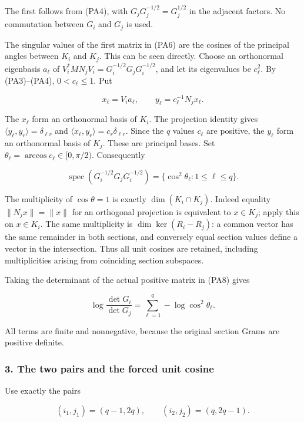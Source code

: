The first follows from (PA4), with \(G_jG_j^{-1/2}=G_j^{1/2}\) in the adjacent factors. No commutation between \(G_i\) and \(G_j\) is used.

The singular values of the first matrix in (PA6) are the cosines of the principal angles between \(K_i\) and \(K_j\). This can be seen directly. Choose an orthonormal eigenbasis \(a_\ell\) of \(V_i^*MN_jV_i=G_i^{-1/2}G_jG_i^{-1/2}\), and let its eigenvalues be \(c_\ell^2\). By (PA3)--(PA4), \(0<c_\ell\le1\). Put

\[
x_\ell=V_i a_\ell,\qquad
y_\ell=c_\ell^{-1}N_jx_\ell.
\tag{PA7}
\]

The \(x_\ell\) form an orthonormal basis of \(K_i\). The projection identity gives \(\langle y_\ell,y_r\rangle=\delta_{\ell r}\) and \(\langle x_\ell,y_r\rangle=c_r\delta_{\ell r}\). Since the \(q\) values \(c_\ell\) are positive, the \(y_\ell\) form an orthonormal basis of \(K_j\). These are principal bases. Set \(\theta_\ell=\arccos c_\ell\in[0,\pi/2)\). Consequently

\[
\boxed{\operatorname{spec}(G_i^{-1/2}G_jG_i^{-1/2})
=\{\cos^2\theta_\ell:1\le\ell\le q\}.}
\tag{PA8}
\]

The multiplicity of \(\cos\theta=1\) is exactly \(\dim(K_i\cap K_j)\). Indeed equality \(\|N_jx\|=\|x\|\) for an orthogonal projection is equivalent to \(x\in K_j\); apply this on \(x\in K_i\). The same multiplicity is \(\dim\ker(R_i-R_j)\): a common vector has the same remainder in both sections, and conversely equal section values define a vector in the intersection. Thus all unit cosines are retained, including multiplicities arising from coinciding section subspaces.

Taking the determinant of the actual positive matrix in (PA8) gives

\[
\log\frac{\det G_i}{\det G_j}
=\sum_{\ell=1}^q-\log\cos^2\theta_\ell.
\tag{PA9}
\]

All terms are finite and nonnegative, because the original section Grams are positive definite.

\subsubsection{3. The two pairs and the forced unit cosine}\label{endpoint-principal_angle_volume_review--the-two-pairs-and-the-forced-unit-cosine}

Use exactly the pairs

\[
(i_1,j_1)=(q-1,2q),\qquad
(i_2,j_2)=(q,2q-1).
\tag{PA10}
\]

